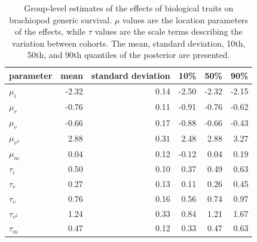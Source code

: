 \documentclass{article}
\begin{document}
\begin{table}
  \centering
  \begin{tabular}{ l r r r r r }
    \hline
    parameter & mean & standard deviation & 10\% & 50\% & 90\% \\ 
    \hline
    \(\mu_{i}\) & -2.32 & 0.14 & -2.50 & -2.32 & -2.15 \\ 
    \(\mu_{r}\) & -0.76 & 0.11 & -0.91 & -0.76 & -0.62 \\ 
    \(\mu_{v}\) & -0.66 & 0.17 & -0.88 & -0.66 & -0.43 \\ 
    \(\mu_{v^{2}}\) & 2.88 & 0.31 & 2.48 & 2.88 & 3.27 \\ 
    \(\mu_{m}\) & 0.04 & 0.12 & -0.12 & 0.04 & 0.19 \\ 
    \(\tau_{i}\) & 0.50 & 0.10 & 0.37 & 0.49 & 0.63 \\ 
    \(\tau_{r}\) & 0.27 & 0.13 & 0.11 & 0.26 & 0.45 \\ 
    \(\tau_{v}\) & 0.76 & 0.16 & 0.56 & 0.74 & 0.97 \\ 
    \(\tau_{v^{2}}\) & 1.24 & 0.33 & 0.84 & 1.21 & 1.67 \\ 
    \(\tau_{m}\) & 0.47 & 0.12 & 0.33 & 0.47 & 0.63 \\ 
    \hline
  \end{tabular}
  \caption{Group-level estimates of the effects of biological traits on brachiopod generic survival. \(\mu\) values are the location parameters of the effects, while \(\tau\) values are the scale terms describing the variation between cohorts. The mean, standard deviation, 10th, 50th, and 90th quantiles of the posterior are presented.}
  \label{tab:param}
\end{table}

\end{document}
